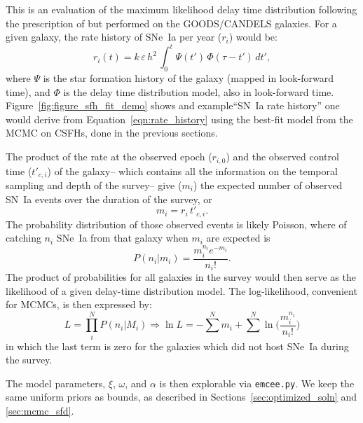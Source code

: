 \documentclass[apj]{aastex}
\begin{document}
This is an evaluation of the maximum likelihood delay time distribution following the prescription of \cite{Maoz:2012a} but performed on the GOODS/CANDELS galaxies. For a given galaxy, the rate history of SNe~Ia per year ($r_i$) would be:
\begin{equation}
r_i (t) = k\,\varepsilon\,h^2\, \int_0^t \Psi(t')\,\Phi(\tau-t')\,dt',
\label{eqn:rate_history}
\end{equation}
\noindent where $\Psi$ is the star formation history of the galaxy (mapped in look-forward time), and $\Phi$ is the delay time distribution model, also in look-forward time. Figure~\ref{fig:figure_sfh_fit_demo} shows and example``SN~Ia rate history'' one would derive from Equation~\ref{eqn:rate_history} using the best-fit model from the MCMC on CSFHs, done in the previous sections.

The product of the rate at the observed epoch ($r_{i,0}$) and the observed control time ($t'_{c, i}$) of the galaxy-- which contains all the information on the temporal sampling and depth of the survey--  give ($m_i$) the expected number of observed SN~Ia events over the duration of the survey, or
\begin{equation}
m_i = r_i \, t'_{c, i}.
\end{equation}
\noindent The probability distribution of those observed events is likely Poisson, where of catching $n_i$ SNe~Ia from that galaxy when $m_i$ are expected is
\begin{equation}
P(n_i | m_i) = \frac{m_i^{n_i}e^{-m_i}}{n_i!}.
\end{equation}
\noindent The product of probabilities for all galaxies in the survey would then serve as the likelihood of a given delay-time distribution model. The log-likelihood, convenient for MCMCs, is then expressed by:
\begin{equation}
L = \prod _i^N P(n_i|M_i) \Rightarrow \ln L = -\sum^N m_i+\sum^N\ln\biggl(\frac{m_i^{n_i}}{n_i!}\biggr)
\end{equation}
\noindent in which the last term is zero for the galaxies which did not host SNe~Ia during the survey.


The model parameters, $\xi$, $\omega$, and $\alpha$ is then explorable via {\tt emcee.py}. We keep the same uniform priors as bounds, as described in Sections~\ref{sec:optimized_soln} and \ref{sec:mcmc_sfd}.
\end{document}
